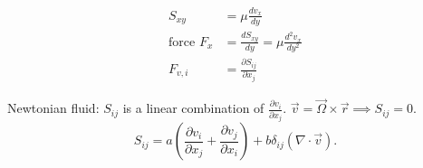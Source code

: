 \documentclass[11pt,a4]{article}
\newcommand{\pardiff}[2]{\frac{\partial #1}{\partial #2}}
\begin{document}
\begin{align*}
	S_{xy} &= \mu \frac{dv_x}{dy} \\
	\text{force } F_x &= \frac{d S_{xy}}{dy} = \mu \frac{d^2 v_x}{dy^2} \\
	F_{v,i} &= \pardiff{S_{ij}}{x_j}
\end{align*}

Newtonian fluid: $S_{ij}$ is a linear combination of $\pardiff{v_i}{x_j}$. $\vec v = \vec \Omega \times \vec r \implies S_{ij} = 0$.
$$
	S_{ij} = a \left( \pardiff{v_i}{x_j} + \pardiff{v_j}{x_i} \right) + b \delta_{ij}(\nabla \cdot \vec v).
$$
\end{document}
